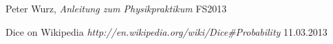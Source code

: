 \documentclass{scrreprt}
\begin{document}
\begin{thebibliography}{9}

  Peter Wurz,
  \emph{Anleitung zum Physikpraktikum}
  FS2013
  
	Dice on Wikipedia
	\emph{http://en.wikipedia.org/wiki/Dice\#Probability}
	11.03.2013

\end{thebibliography}
\end{document}
